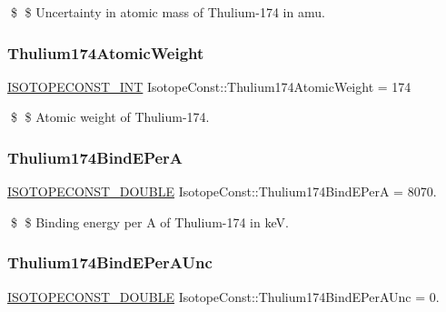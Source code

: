 \$ \$ Uncertainty in atomic mass of Thulium-\/174 in amu. \mbox{\label{group___isotope_const-_thulium-_tm174_gab25c3e650d0b5f3802f008d9d4530898}} 
\subsubsection{\texorpdfstring{Thulium174\+Atomic\+Weight}{Thulium174AtomicWeight}}
{\footnotesize\ttfamily \mbox{\hyperlink{group___isotope_const-_macros_ga5f18360b3e99483a35c32d789e62621c}{I\+S\+O\+T\+O\+P\+E\+C\+O\+N\+S\+T\+\_\+\+I\+NT}} Isotope\+Const\+::\+Thulium174\+Atomic\+Weight = 174}

\$ \$ Atomic weight of Thulium-\/174. \mbox{\label{group___isotope_const-_thulium-_tm174_gad8201437560c84e4b0270f9fd861cac2}} 
\subsubsection{\texorpdfstring{Thulium174\+Bind\+E\+PerA}{Thulium174BindEPerA}}
{\footnotesize\ttfamily \mbox{\hyperlink{group___isotope_const-_macros_ga8f45a7272ce02c0b4c65c44636ed719a}{I\+S\+O\+T\+O\+P\+E\+C\+O\+N\+S\+T\+\_\+\+D\+O\+U\+B\+LE}} Isotope\+Const\+::\+Thulium174\+Bind\+E\+PerA = 8070.}

\$ \$ Binding energy per A of Thulium-\/174 in keV. \mbox{\label{group___isotope_const-_thulium-_tm174_gafbdf3055f936657abb8b5bef9027aa2e}} 
\subsubsection{\texorpdfstring{Thulium174\+Bind\+E\+Per\+A\+Unc}{Thulium174BindEPerAUnc}}
{\footnotesize\ttfamily \mbox{\hyperlink{group___isotope_const-_macros_ga8f45a7272ce02c0b4c65c44636ed719a}{I\+S\+O\+T\+O\+P\+E\+C\+O\+N\+S\+T\+\_\+\+D\+O\+U\+B\+LE}} Isotope\+Const\+::\+Thulium174\+Bind\+E\+Per\+A\+Unc = 0.}

